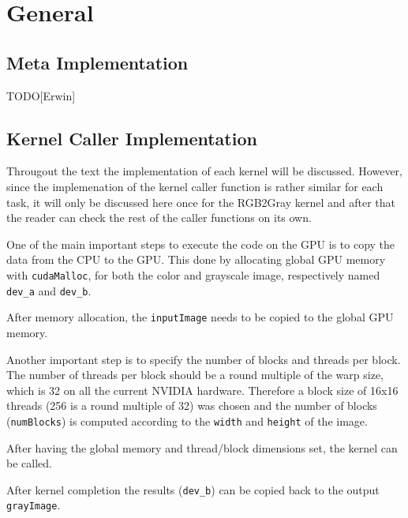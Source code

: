 \documentclass[final]{report}
\begin{document}
\chapter{General}

\section{Meta Implementation}
TODO[Erwin]

\section{Kernel Caller Implementation}
Througout the text the implementation of each kernel will be discussed.
However, since the implemenation of the kernel caller function is rather similar for each task, it will only be discussed here once for the RGB2Gray kernel and after that the reader can check the rest of the caller functions on its own.

One of the main important steps to execute the code on the GPU is to copy the data from the CPU to the GPU.
This done by allocating global GPU memory with \texttt{cudaMalloc}, for both the color and grayscale image, respectively named \texttt{dev\_a} and \texttt{dev\_b}.

After memory allocation, the \texttt{inputImage} needs to be copied to the global GPU memory.


Another important step is to specify the number of blocks and threads per block.
The number of threads per block should be a round multiple of the warp size, which is 32 on all the current NVIDIA hardware.
Therefore a block size of 16x16 threads (256 is a round multiple of 32) was chosen and the number of blocks (\texttt{numBlocks}) is computed according to the \texttt{width} and \texttt{height} of the image.


After having the global memory and thread/block dimensions set, the kernel can be called.


After kernel completion the results (\texttt{dev\_b}) can be copied back to the output \texttt{grayImage}.
\end{document}

